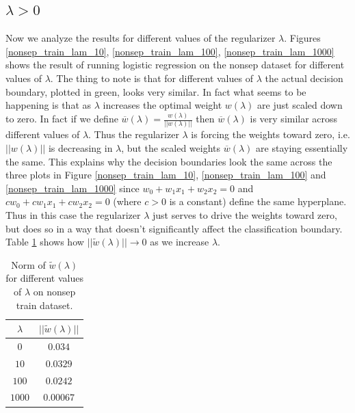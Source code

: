 \documentclass[10pt]{article}
\begin{document}
\subsection{$\lambda > 0$}
Now we analyze the results for different values of the regularizer $\lambda$. Figures \ref{nonsep_train_lam_10}, \ref{nonsep_train_lam_100}, \ref{nonsep_train_lam_1000} shows the result of running logistic regression on the nonsep dataset for different values of $\lambda$. The thing to note is that for different values of $\lambda$ the actual decision boundary, plotted in green, looks very similar. In fact what seems to be happening is that as $\lambda$ increases the optimal weight $w(\lambda)$ are just scaled down to zero. In fact if we define $\overline{w}(\lambda) = \frac{w(\lambda)}{||w(\lambda)||}$ then $\overline{w}(\lambda)$ is very similar across different values of $\lambda$. Thus the regularizer $\lambda$ is forcing the weights toward zero, i.e. $||w(\lambda)||$ is decreasing in $\lambda$, but the scaled weights $\overline{w}(\lambda)$ are staying essentially the same. This explains why the decision boundaries look the same across the three plots in Figure \ref{nonsep_train_lam_10}, \ref{nonsep_train_lam_100} and \ref{nonsep_train_lam_1000} since $w_0 + w_1 x_1 + w_2 x_2 = 0$ and $c w_0 + c w_1 x_1 + c w_2 x_2 = 0$ (where $c > 0$ is a constant) define the same hyperplane. Thus in this case the regularizer $\lambda$ just serves to drive the weights toward zero, but does so in a way that doesn't significantly affect the classification boundary. Table \ref{w_lam_norm} shows how $||\tilde{w}(\lambda)|| \to 0$ as we increase $\lambda$.

\begin{table}[H]
\begin{tabular}{|c|c|}
\hline
$\lambda$ & $||\tilde{w}(\lambda)||$\\ \hline
$0$ & $0.034$ \\ \hline
$10$ & $0.0329$ \\ \hline
$100$ & $0.0242$ \\ \hline
$1000$ & $0.00067$ \\ \hline
\end{tabular}

\caption{Norm of $\tilde{w}(\lambda)$ for different values of $\lambda$ on nonsep train dataset.}
\label{w_lam_norm}
\end{table}
\end{document}
